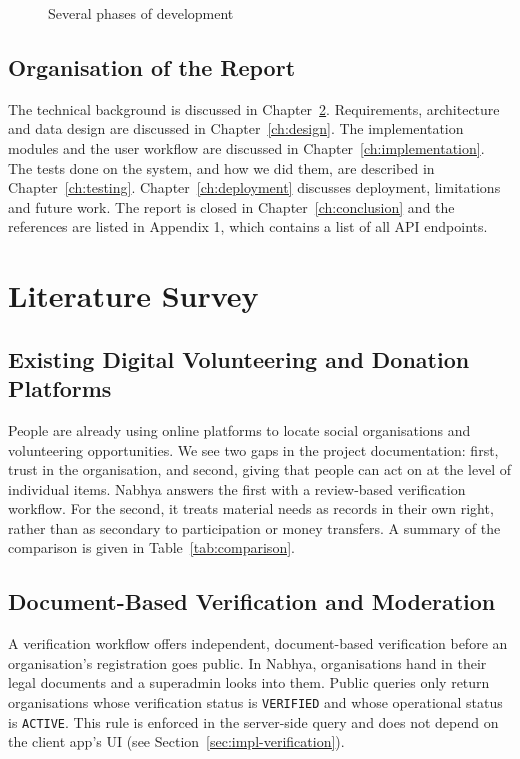 \begin{figure}[H]
    \centering
    \caption{Several phases of development}
    \label{fig:timeline}
\end{figure}

\section{Organisation of the Report}
The technical background is discussed in Chapter~\ref{ch:literature}. Requirements, architecture and data design are discussed in Chapter~\ref{ch:design}. The implementation modules and the user workflow are discussed in Chapter~\ref{ch:implementation}. The tests done on the system, and how we did them, are described in Chapter~\ref{ch:testing}. Chapter~\ref{ch:deployment} discusses deployment, limitations and future work. The report is closed in Chapter~\ref{ch:conclusion} and the references are listed in Appendix 1, which contains a list of all API endpoints.

\chapter{Literature Survey}
\label{ch:literature}

\section{Existing Digital Volunteering and Donation Platforms}
People are already using online platforms to locate social organisations and volunteering opportunities. We see two gaps in the project documentation: first, trust in the organisation, and second, giving that people can act on at the level of individual items. Nabhya answers the first with a review-based verification workflow. For the second, it treats material needs as records in their own right, rather than as secondary to participation or money transfers. A summary of the comparison is given in Table~\ref{tab:comparison}.

\section{Document-Based Verification and Moderation}
A verification workflow offers independent, document-based verification before an organisation's registration goes public. In Nabhya, organisations hand in their legal documents and a superadmin looks into them. Public queries only return organisations whose verification status is \texttt{VERIFIED} and whose operational status is \texttt{ACTIVE}. This rule is enforced in the server-side query and does not depend on the client app's UI (see Section~\ref{sec:impl-verification}).


